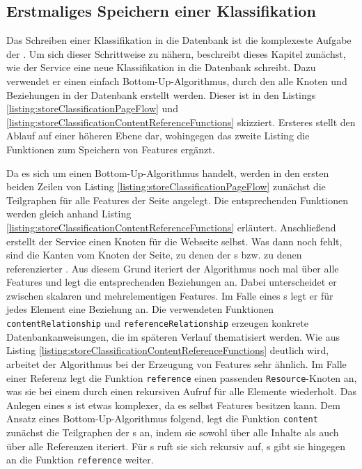 \subsection{Erstmaliges Speichern einer Klassifikation}
    \label{section:solutionDetailsStorageAPIInitialWrite}
    Das Schreiben einer Klassifikation in die Datenbank ist die
    komplexeste Aufgabe der {\classificationStorageAPI}.
    Um sich dieser Schrittweise zu nähern, beschreibt dieses Kapitel zunächst,
    wie der Service eine neue Klassifikation in die Datenbank schreibt.
    Dazu verwendet er einen
    einfach Bottom-Up-Algorithmus, durch den alle Knoten und Beziehungen
    in der Datenbank erstellt werden.
    Dieser ist in den Listings \ref{listing:storeClassificationPageFlow} und
    \ref{listing:storeClassificationContentReferenceFunctions} skizziert.
    Ersteres stellt den Ablauf auf einer höheren Ebene dar, wohingegen
    das zweite Listing die Funktionen zum Speichern von Features ergänzt.
    
    

    Da es sich um einen Bottom-Up-Algorithmus handelt,
    werden in den ersten beiden Zeilen von Listing \ref{listing:storeClassificationPageFlow}
    zunächst die Teilgraphen für alle Features der Seite angelegt.
    Die entsprechenden Funktionen werden gleich anhand Listing \ref{listing:storeClassificationContentReferenceFunctions} erläutert.
    Anschließend erstellt der Service einen Knoten für die Webseite selbst.
    Was dann noch fehlt, sind die Kanten vom Knoten der Seite,
    zu denen der {\contentFeature}s bzw. zu denen referenzierter {\resources}.
    Aus diesem Grund iteriert der Algorithmus noch mal über alle Features
    und legt die entsprechenden Beziehungen an.
    Dabei unterscheidet er zwischen skalaren und mehrelementigen Features.
    Im Falle eines {\collectionFeature}s legt er für jedes Element eine Beziehung an.
    Die verwendeten Funktionen \texttt{contentRelationship} und \texttt{referenceRelationship}
    erzeugen konkrete Datenbankanweisungen, die im späteren Verlauf thematisiert
    werden.
    Wie aus Listing \ref{listing:storeClassificationContentReferenceFunctions} deutlich wird,
    arbeitet der Algorithmus bei der Erzeugung von Features sehr ähnlich.
    Im Falle einer Referenz legt die Funktion \texttt{reference} einen passenden \texttt{Resource}-Knoten an,   
    was sie bei einem {\collectionFeature} durch einen rekursiven Aufruf für alle Elemente wiederholt.
    Das Anlegen eines {\contentFeature}s ist etwas komplexer,
    da es selbst Features besitzen kann.
    Dem Ansatz eines Bottom-Up-Algorithmus folgend, legt die Funktion \texttt{content}
    zunächst die Teilgraphen der {\childFeature}s an,
    indem sie sowohl über alle Inhalte als auch über alle Referenzen iteriert.
    Für {\contentFeature}s ruft sie sich rekursiv auf,
    {}s gibt sie hingegen an die Funktion \texttt{reference} weiter.

